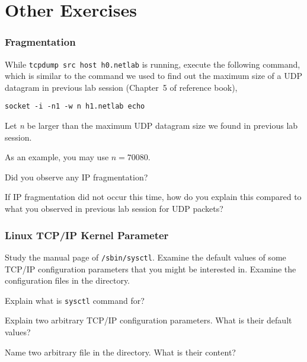 \documentclass{../UTNetLab}
\begin{document}
\part{Other Exercises}
\section{Fragmentation}
    While \lstinline[emph={h0,h1,netlab}]{tcpdump src host h0.netlab} is running, execute the following command, which is similar to the command we used to find out the maximum size of a UDP datagram in previous lab session (Chapter~5 of reference book),
    \begin{lstlisting}[emph={n, h1,netlab}]
socket -i -n1 -w n h1.netlab echo
    \end{lstlisting}
    Let \textit{n} be larger than the maximum UDP datagram size we found in previous lab session.

    As an example, you may use $n = 70080$.

    \begin{report}
        \item Did you observe any IP fragmentation?
            
        \item If IP fragmentation did not occur this time, how do you explain this compared to what you observed in previous lab session for UDP packets?
    \end{report}

\section{Linux TCP/IP Kernel Parameter}
    Study the manual page of \lstinline{/sbin/sysctl}.
    Examine the default values of some TCP/IP configuration parameters that you might be interested in.
    Examine the configuration files in the  directory.

    \begin{report}
        \item Explain what is \lstinline{sysctl} command for?
            
        \item Explain two arbitrary TCP/IP configuration parameters.
                What is their default values?
            
        \item Name two arbitrary file in the  directory.
                What is their content?
    \end{report}
\end{document}
